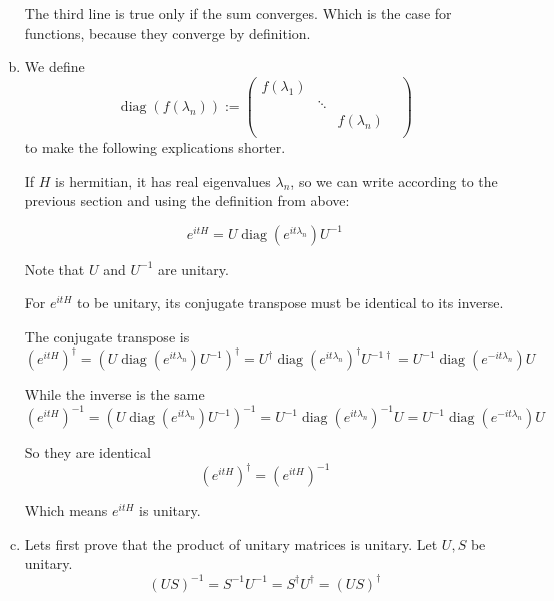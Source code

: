\documentclass[a4paper,german,12pt,smallheadings]{scrartcl}
\begin{document}
\begin{enumerate}[a)]
    The third line is true only if the sum converges. Which is the case for
    functions, because they converge by definition.
  \item
    We define
    \begin{equation*}
      \operatorname{diag}(f(\lambda_n)) :=
      \begin{pmatrix} 
        f(\lambda_1) &             & \\
                   & \ddots      & \\
                   &             & f(\lambda_n) & \\
      \end{pmatrix} 
    \end{equation*}
    to make the following explications shorter.

    If $H$ is hermitian, it has real eigenvalues $\lambda_n$, so we can write
    according to the previous section and using the definition from above:

    \begin{equation*}
      e^{itH} = U \operatorname{diag}(e^{it\lambda_n}) U^{-1}
    \end{equation*}

    Note that $U$ and $U^{-1}$ are unitary.

    For $e^{itH}$ to be unitary, its conjugate transpose must be identical to
    its inverse.

    The conjugate transpose is
    \begin{equation*}
      \left(e^{itH}\right)^\dagger
      = \left(U \operatorname{diag}(e^{it\lambda_n}) U^{-1}\right)^\dagger
      = U^\dagger \operatorname{diag}(e^{it\lambda_n})^\dagger U^{-1\dagger}
      = U^{-1} \operatorname{diag}(e^{-it\lambda_n}) U
    \end{equation*}


    While the inverse is the same
    \begin{equation*}
      \left(e^{itH}\right)^{-1}
      = \left(U \operatorname{diag}(e^{it\lambda_n}) U^{-1}\right)^{-1}
      = U^{-1} \operatorname{diag}(e^{it\lambda_n})^{-1} U
      = U^{-1} \operatorname{diag}(e^{-it\lambda_n}) U
    \end{equation*}

    So they are identical
    \begin{equation*}
      \left(e^{itH}\right)^\dagger = \left(e^{itH}\right)^{-1}
    \end{equation*}

    Which means $e^{itH}$ is unitary.
  \item
    Lets first prove that the product of unitary matrices is unitary. Let $U,S$ be
    unitary.
    \begin{equation*}
      (US)^{-1} = S^{-1}U^{-1} = S^\dagger U^\dagger = (US)^\dagger
    \end{equation*}


\end{enumerate}
\end{document}
